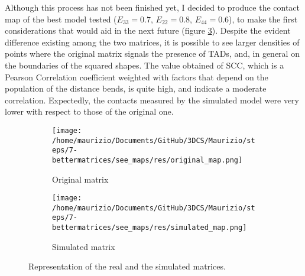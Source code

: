 Although this process has not been finished yet, I decided to produce the contact map of the best model tested ($E_{33} = 0.7$, $E_{22} = 0.8$, $E_{44} = 0.6$), to make the first considerations that would aid in the next future (figure \ref{fig: matrices}). Despite the evident difference existing among the two matrices, it is possible to see larger densities of points where the original matrix signals the presence of TADs, and, in general on the boundaries of the squared shapes. The value obtained of SCC, which is a Pearson Correlation coefficient weighted with factors that depend on the population of the distance bends, is quite high, and indicate a moderate correlation.
Expectedly, the contacts measured by the simulated model were very lower with respect to those of the original one.


\begin{figure}[H]
    \centering
    
    \begin{subfigure}{0.60\textwidth}
      \texttt{[image: /home/maurizio/Documents/GitHub/3DCS/Maurizio/steps/7-bettermatrices/see\_maps/res/original\_map.png]}
      \caption{Original matrix}
      \label{fig: original matrix}
    \end{subfigure}
    \hfill
    \begin{subfigure}{0.60\textwidth}
      \texttt{[image: /home/maurizio/Documents/GitHub/3DCS/Maurizio/steps/7-bettermatrices/see\_maps/res/simulated\_map.png]}
      \caption{Simulated matrix}
      \label{fig: simulated matrix}
    \end{subfigure}
  
    \caption{Representation of the real and the simulated matrices.}
    \label{fig: matrices}
\end{figure}


